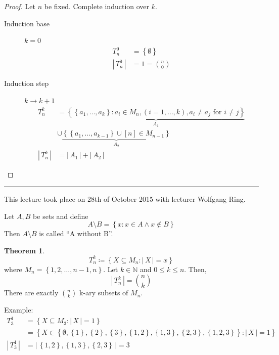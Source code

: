 \documentclass[a4paper,landscape,twocolumn]{article}
\theoremstyle{definition}
\newtheorem{theorem}{Theorem}
\newcommand\set[1]{\left\{#1\right\}}
\newcommand\card[1]{\left|\,#1\,\right|}
\newcommand\meta[3]{\hrule{} This #1 took place on #2 with lecturer #3.\par}
\begin{document}
\begin{proof}
  Let $n$ be fixed. Complete induction over $k$.
  \begin{description}
    \item[Induction base] $k=0$
      \begin{align*}
        T_n^0        &= \set{\emptyset} \\
        \card{T_n^0} &= 1 = \binom n0
      \end{align*}
    \item[Induction step] $k\rightarrow k+1$
      \begin{align*}
        T_n^k &= \underbrace{\set{\set{a_1, \ldots, a_k}: a_i \in M_n, (i = 1, \ldots, k), a_i \neq a_j \text{ for } i \neq j}}_{A_1} \\
              &\cup \underbrace{\set{\set{a_1, \ldots, a_{k-1}} \cup [n] \in M_{n-1}}}_{A_2} \\
        \card{T_n^k} &= \card{A_1} + \card{A_2}
      \end{align*}
  \end{description}
\end{proof}

\meta{lecture}{28th of October 2015}{Wolfgang Ring}

Let $A, B$ be sets and define
\[ A \setminus B = \set{x: x \in A \land x \not\in B} \]
Then $A \setminus B$ is called \enquote{A without B}.

\begin{theorem}
  \[ T_n^k \coloneqq \set{X \subseteq M_n: \card{X} = x} \]
  where $M_n = \set{1, 2, \ldots, n-1, n}$.
  Let $k \in \mathbb{N}$ and $0 \leq k \leq n$. Then,
  \[ \card{T_n^k} = \binom{n}{k} \]
  There are exactly $\binom{n}{k}$ k-ary subsets of $M_n$.
\end{theorem}

Example:
\begin{align*}
  T_3^1 &= \set{X \subseteq M_3: \card{X} = 1} \\
    &= \set{X \in \set{\emptyset, \set{1}, \set{2}, \set{3}, \set{1,2}, \set{1,3}, \set{2,3}, \set{1,2,3}}: \card{X} = 1} \\
  \card{T_3^1} &= \card{\set{1,2}, \set{1,3}, \set{2,3}} = 3
\end{align*}
\end{document}
